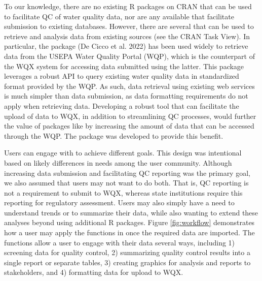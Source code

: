 To our knowledge, there are no existing R packages on CRAN that can be used to facilitate QC of water quality data, nor are any available that facilitate submission to existing databases. However, there are several that can be used to retrieve and analysis data from existing sources (see the CRAN  Task View). In particular, the  package (De Cicco et al. 2022) has been used widely to retrieve data from the USEPA Water Quality Portal (WQP), which is the counterpart of the WQX system for accessing data submitted using the latter. This package leverages a robust API to query existing water quality data in standardized format provided by the WQP. As such, data retrieval using existing web services is much simpler than data submission, as data formatting requirements do not apply when retrieving data. Developing a robust tool that can facilitate the upload of data to WQX, in addition to streamlining QC processes, would further the value of packages like  by increasing the amount of data that can be accessed through the WQP. The  package was developed to provide this benefit.

Users can engage with  to achieve different goals. This design was intentional based on likely differences in needs among the user community. Although increasing data submission and facilitating QC reporting was the primary goal, we also assumed that users may not want to do both. That is, QC reporting is not a requirement to submit to WQX, whereas state institutions require this reporting for regulatory assessment. Users may also simply have a need to understand trends or to summarize their data, while also wanting to extend these analyses beyond  using additional R packages. Figure \ref{fig:workflow} demonstrates how a user may apply the functions in  once the required data are imported. The functions allow a user to engage with their data several ways, including 1) screening data for quality control, 2) summarizing quality control results into a single report or separate tables, 3) creating graphics for analysis and reports to stakeholders, and 4) formatting data for upload to WQX.

